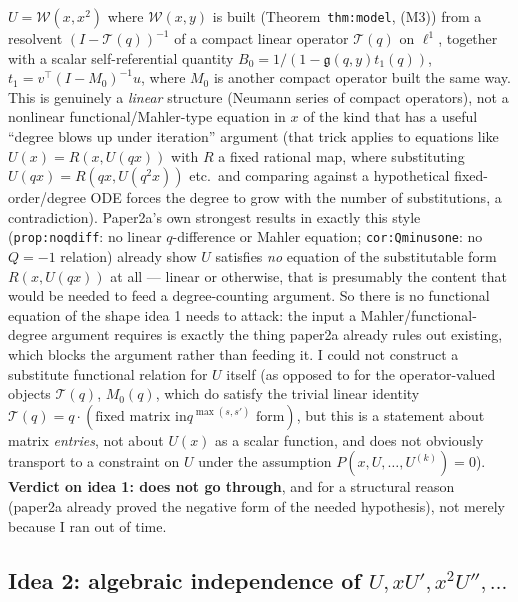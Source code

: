 \documentclass[11pt]{article}
\theoremstyle{remark}
\begin{document}
$U=\mathcal W(x,x^2)$ where $\mathcal W(x,y)$ is built (Theorem~\texttt{thm:model}, (M3)) from a
resolvent $(I-\mathcal T(q))^{-1}$ of a compact linear operator $\mathcal T(q)$ on $\ell^1$, together
with a scalar self-referential quantity $B_0=1/(1-\mathfrak g(q,y)t_1(q))$, $t_1=v^\top(I-M_0)^{-1}u$,
where $M_0$ is another compact operator built the same way. This is genuinely a \emph{linear}
structure (Neumann series of compact operators), not a nonlinear functional/Mahler-type equation in
$x$ of the kind that has a useful ``degree blows up under iteration'' argument (that trick applies to
equations like $U(x)=R(x,U(qx))$ with $R$ a fixed rational map, where substituting $U(qx)=R(qx,U(q^2x))$
etc.\ and comparing against a hypothetical fixed-order/degree ODE forces the degree to grow with the
number of substitutions, a contradiction). Paper2a's own strongest results in exactly this style
(\texttt{prop:noqdiff}: no linear $q$-difference or Mahler equation; \texttt{cor:Qminusone}: no
$Q=-1$ relation) already show $U$ satisfies \emph{no} equation of the substitutable form $R(x,U(qx))$
at all --- linear or otherwise, that is presumably the content that would be needed to feed a
degree-counting argument. So there is no functional equation of the shape idea 1 needs to attack:
the input a Mahler/functional-degree argument requires is exactly the thing paper2a already rules out
existing, which blocks the argument rather than feeding it. I could not construct a substitute
functional relation for $U$ itself (as opposed to for the operator-valued objects $\mathcal T(q)$,
$M_0(q)$, which do satisfy the trivial linear identity $\mathcal T(q)=q\cdot(\text{fixed matrix in
}q^{\max(s,s')}\text{ form})$, but this is a statement about matrix \emph{entries}, not about $U(x)$
as a scalar function, and does not obviously transport to a constraint on $U$ under the assumption
$P(x,U,\ldots,U^{(k)})=0$). \textbf{Verdict on idea 1: does not go through}, and for a structural
reason (paper2a already proved the negative form of the needed hypothesis), not merely because I
ran out of time.

\subsection{Idea 2: algebraic independence of $U,xU',x^2U'',\ldots$}
\end{document}
